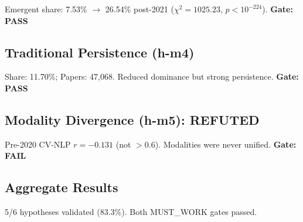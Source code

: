 Emergent share: 7.53\% $\rightarrow$ 26.54\% post-2021 ($\chi^2 = 1025.23$, $p < 10^{-224}$). \textbf{Gate: PASS}

\subsection{Traditional Persistence (h-m4)}

Share: 11.70\%; Papers: 47,068. Reduced dominance but strong persistence. \textbf{Gate: PASS}

\subsection{Modality Divergence (h-m5): REFUTED}

Pre-2020 CV-NLP $r = -0.131$ (not $>0.6$). Modalities were never unified. \textbf{Gate: FAIL}

\subsection{Aggregate Results}

5/6 hypotheses validated (83.3\%). Both MUST\_WORK gates passed.
